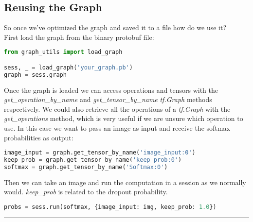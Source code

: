 \documentclass[12pt, draft]{report}
\begin{document}
\subsection*{Reusing the Graph}
\begin{changemargin}{0.5cm}{2.0cm}
So once we’ve optimized the graph and saved it to a file how do we use it?\vspace{0.5cm}\\
First load the graph from the binary protobuf file:
\begin{lstlisting}[language=Python]
from graph_utils import load_graph

sess, _ = load_graph('your_graph.pb')
graph = sess.graph
\end{lstlisting}
Once the graph is loaded we can access operations and tensors with the \textit{get\_operation\_by\_name} and
\textit{get\_tensor\_by\_name} \textit{tf.Graph} methods respectively. We could also retrieve all the operations
of a \textit{tf.Graph} with the \textit{get\_operations} method, which is very useful if we are unsure which
operation to use. In this case we want to pass an image as input and receive the softmax probabilities as output:
\begin{lstlisting}[language=Python]
image_input = graph.get_tensor_by_name('image_input:0')
keep_prob = graph.get_tensor_by_name('keep_prob:0')
softmax = graph.get_tensor_by_name('Softmax:0')
\end{lstlisting}
Then we can take an image and run the computation in a session as we normally would. \textit{keep\_prob} is
related to the dropout probability.
\begin{lstlisting}[language=Python]
probs = sess.run(softmax, {image_input: img, keep_prob: 1.0})
\end{lstlisting}
\end{changemargin}

\noindent\rule{\textwidth}{1pt}
\end{document}

